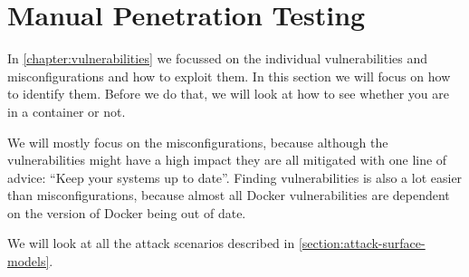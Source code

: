 \section{Manual Penetration Testing}
In \autoref{chapter:vulnerabilities} we focussed on the individual vulnerabilities and misconfigurations and how to exploit them. In this section we will focus on how to identify them. Before we do that, we will look at how to see whether you are in a container or not.

We will mostly focus on the misconfigurations, because although the vulnerabilities might have a high impact they are all mitigated with one line of advice: ``Keep your systems up to date''. Finding vulnerabilities is also a lot easier than misconfigurations, because almost all Docker vulnerabilities are dependent on the version of Docker being out of date.

We will look at all the attack scenarios described in \autoref{section:attack-surface-models}.





